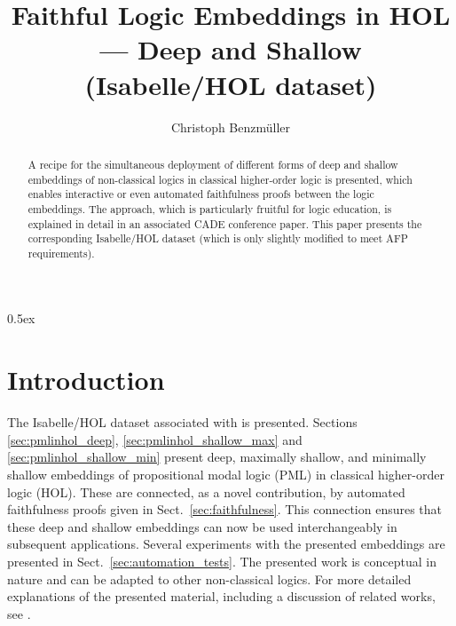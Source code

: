 \documentclass[11pt,a4paper]{article}
\begin{document}
\title{Faithful Logic Embeddings in HOL --- Deep and Shallow (Isabelle/HOL dataset)}
\author{Christoph Benzm{\"u}ller}
\maketitle

\begin{abstract}
A recipe for the simultaneous deployment of different forms of deep and shallow embeddings of non-classical logics in classical higher-order logic is presented, which enables interactive or even automated faithfulness proofs between the logic embeddings. The approach, which is particularly fruitful for logic education, is explained in detail in an associated CADE conference paper. This paper presents the corresponding Isabelle/HOL dataset (which is only slightly modified to meet AFP requirements).
\end{abstract}

\tableofcontents

\parindent 0pt\parskip 0.5ex


\section{Introduction}
The Isabelle/HOL dataset associated with \cite{CADEversion} is presented.  Sections \ref{sec:pmlinhol_deep}, \ref{sec:pmlinhol_shallow_max} and \ref{sec:pmlinhol_shallow_min} present deep, maximally shallow, and minimally shallow embeddings of propositional modal logic (PML) in classical higher-order logic (HOL). These are connected,  as a novel contribution, by automated faithfulness proofs given in Sect.~\ref{sec:faithfulness}. This connection ensures that these deep and shallow embeddings can now be used interchangeably in subsequent applications.
Several experiments with the presented embeddings are presented in Sect.~\ref{sec:automation_tests}. The presented work is conceptual in nature and can be adapted to other non-classical logics. For more detailed explanations of the presented material, including a discussion of related works, see \cite{CADEversion}.





\end{document}
